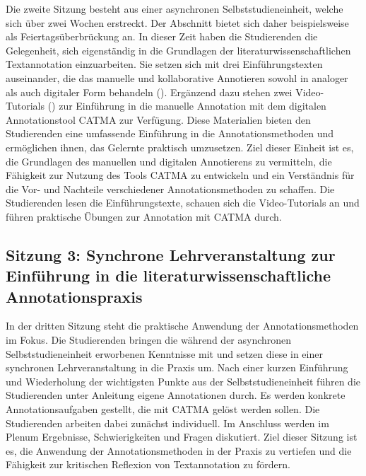 \documentclass[
          a4paper,
        ]{article}
\begin{document}
Die zweite Sitzung besteht aus einer asynchronen Selbststudieneinheit,
welche sich über zwei Wochen erstreckt. Der Abschnitt bietet sich daher
beispielsweise als Feiertagsüberbrückung an. In dieser Zeit haben die
Studierenden die Gelegenheit, sich eigenständig in die Grundlagen der
literaturwissenschaftlichen Textannotation einzuarbeiten. Sie setzen
sich mit drei Einführungstexten auseinander, die das manuelle und
kollaborative Annotieren sowohl in analoger als auch digitaler Form
behandeln
(). Ergänzend dazu stehen zwei Video-Tutorials
()
zur Einführung in die manuelle Annotation mit dem digitalen
Annotationstool CATMA zur Verfügung. Diese Materialien bieten den
Studierenden eine umfassende Einführung in die Annotationsmethoden und
ermöglichen ihnen, das Gelernte praktisch umzusetzen. Ziel dieser
Einheit ist es, die Grundlagen des manuellen und digitalen Annotierens
zu vermitteln, die Fähigkeit zur Nutzung des Tools CATMA zu entwickeln
und ein Verständnis für die Vor- und Nachteile verschiedener
Annotationsmethoden zu schaffen. Die Studierenden lesen die
Einführungstexte, schauen sich die Video-Tutorials an und führen
praktische Übungen zur Annotation mit CATMA durch.

\subsection{Sitzung 3: Synchrone Lehrveranstaltung zur Einführung in die
literaturwissenschaftliche
Annotationspraxis}\label{sitzung-3-synchrone-lehrveranstaltung-zur-einfuxfchrung-in-die-literaturwissenschaftliche-annotationspraxis}

In der dritten Sitzung steht die praktische Anwendung der
Annotationsmethoden im Fokus. Die Studierenden bringen die während der
asynchronen Selbststudieneinheit erworbenen Kenntnisse mit und setzen
diese in einer synchronen Lehrveranstaltung in die Praxis um. Nach einer
kurzen Einführung und Wiederholung der wichtigsten Punkte aus der
Selbststudieneinheit führen die Studierenden unter Anleitung eigene
Annotationen durch. Es werden konkrete Annotationsaufgaben gestellt, die
mit CATMA gelöst werden sollen. Die Studierenden arbeiten dabei zunächst
individuell. Im Anschluss werden im Plenum Ergebnisse, Schwierigkeiten
und Fragen diskutiert. Ziel dieser Sitzung ist es, die Anwendung der
Annotationsmethoden in der Praxis zu vertiefen und die Fähigkeit zur
kritischen Reflexion von Textannotation zu fördern.
\end{document}
